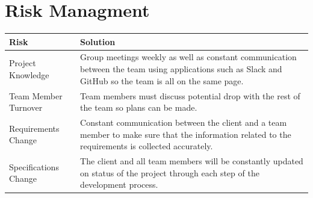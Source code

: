 \documentclass{scrreprt}
\begin{document}
	\section{Risk Managment}
	\begin{tabular}{|p{5cm}|p{9cm}|}
		\hline 
		Risk & Solution \\ 
		\hline 
		Project Knowledge &  Group meetings weekly as well as constant communication between the team using applications such as Slack and GitHub so the team is all on the same page.\\ 
		\hline 
		Team Member Turnover & Team members must discuss potential drop with the rest of the team so plans can be made.\\ 
		\hline 
		Requirements Change & Constant communication between the client and a team member to make sure that the information related to the requirements is collected accurately.\\ 
		\hline 
		Specifications Change & The client and all team members will be constantly updated on status of the project through each step of the development process. \\ 
		\hline 
	\end{tabular} 
\end{document}
